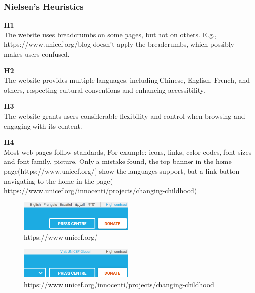 \subsubsection{Nielsen's Heuristics}
\begin{description}
\item {\textbf{H1} \color{unicefGray}{Visibility of the system status}}\\
The website uses breadcrumbs on some pages, but not on others. E.g., https://www.unicef.org/blog doesn't apply the breadcrumbs, which possibly makes users confused.

\item {\textbf{H2} \color{unicefGray}{Match between system and the real world}}\\
The website provides multiple languages, including Chinese, English, French, and others, respecting cultural conventions and enhancing accessibility.

\item {\textbf{H3} \color{unicefGray}{User control and freedom}}\\
The website grants users considerable flexibility and control when browsing and engaging with its content.

\item {\textbf{H4} \color{unicefGray}{Consistency and standards}}\\
Most web pages follow standards, For example: icons, links, color codes, font sizes and font family, picture. 
Only a mistake found, the top banner in the home page(https://www.unicef.org/) show the languages support, but a link button navigating to the home in the page( https://www.unicef.org/innocenti/projects/changing-childhood)
\begin{figure}[h]
	\centering
	\includegraphics[width=0.5\textwidth]{Images/yan_h4_1.png}
	\caption{https://www.unicef.org/}
	\label{fig:h4_1}
\end{figure}
\begin{figure}[h]
	\centering
	\includegraphics[width=0.5\textwidth]{Images/yan_h4_2.png}
	\caption{https://www.unicef.org/innocenti/projects/changing-childhood}
	\label{fig:h4_2}
\end{figure}


\end{description}
